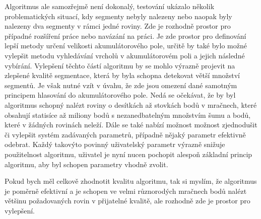 \documentclass[11pt,twoside,a4paper]{book}
\begin{document}
Algoritmus ale samozřejmě není dokonalý, testování ukázalo několik problematických situací, kdy segmenty nebyly nalezeny nebo naopak byly nalezeny dva segmenty v rámci jedné roviny. Zde je rozhodně prostor pro případné rozšíření práce nebo navázání na práci. Je zde prostor pro definování lepší metody určení velikosti akumulátorového pole, určitě by také bylo možné vylepšit metodu vyhledávání vrcholů v akumulátorovém poli a jejich následné vybírání. Vylepšení těchto částí algoritmu by se mohlo výrazně projevit na zlepšené kvalitě segmentace, která by byla schopna detekovat větší množství segmentů. Je však nutné vzít v úvahu, že zde jsou omezení dané samotným principem hlasování do akumulátorového pole. Nedá se očekávat, že by byl algoritmus schopný nalézt roviny o desítkách až stovkách bodů v mračnech, které obsahují statisíce až miliony bodů s nezanedbatelným množstvím šumu a bodů, které v žádných rovinách neleží. Dále se také nabízí možnost možnost zjednodušit či vylepšit systém zadávaných parametrů, případně nějaký parametr efektivně odebrat. Každý takovýto povinný uživatelský parametr výrazně snižuje použitelnost algoritmu, uživatel je nyní nucen pochopit alespoň základní princip algoritmu, aby byl schopen parametry vhodně zvolit.

Pokud bych měl celkově zhodnotit kvalitu algoritmu, tak si myslím, že algoritmus je poměrně efektivní a je schopen ve velmi různorodých mračnech bodů nalézt většinu požadovaných rovin v přijatelné kvalitě, ale rozhodně zde je prostor pro vylepšení.





%




%
\def\CS{$\cal C\kern-0.1667em\lower.5ex\hbox{$\cal S$}\kern-0.075em $}

\end{document}

